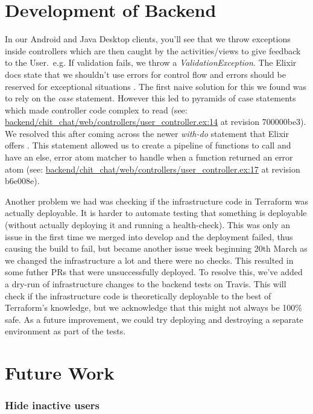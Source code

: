 \documentclass[11pt,a4paper]{report}
\begin{document}
\section{Development of Backend}

In our Android and Java Desktop clients, you'll see that we throw exceptions inside controllers which are then caught by the activities/views to give feedback to the User.\ e.g. If validation fails, we throw a \emph{ValidationException}. The Elixir docs state that we shouldn't use errors for control flow and errors should be reserved for exceptional situations \cite{website:elixir_error_flow}. The first naive solution for this we found was to rely on the \emph{case} statement. However this led to pyramids of case statements which made controller code complex to read (see: \url{backend/chit_chat/web/controllers/user_controller.ex:14} at revision 700000be3). We resolved this after coming across the newer \emph{with-do} statement that Elixir offers \cite{website:elixir_with}. This statement allowed us to create a pipeline of functions to call and have an else, error atom matcher to handle when a function returned an error atom (see: \url{backend/chit_chat/web/controllers/user_controller.ex:17} at revision b6e008e).

Another problem we had was checking if the infrastructure code in Terraform was actually deployable. It is harder to automate testing that something is deployable (without actually deploying it and running a health-check). This was only an issue in the first time we merged into develop and the deployment failed, thus causing the build to fail, but became another issue week beginning 20th March as we changed the infrastructure a lot and there were no checks. This resulted in some futher PRs that were unsuccessfully deployed. To resolve this, we've added a dry-run of infrastructure changes to the backend tests on Travis. This will check if the infrastructure code is theoretically deployable to the best of Terraform's knowledge, but we acknowledge that this might not always be 100\% safe. As a future improvement, we could try deploying and destroying a separate environment as part of the tests.

\section{Future Work}

\subsubsection{Hide inactive users}
\end{document}
